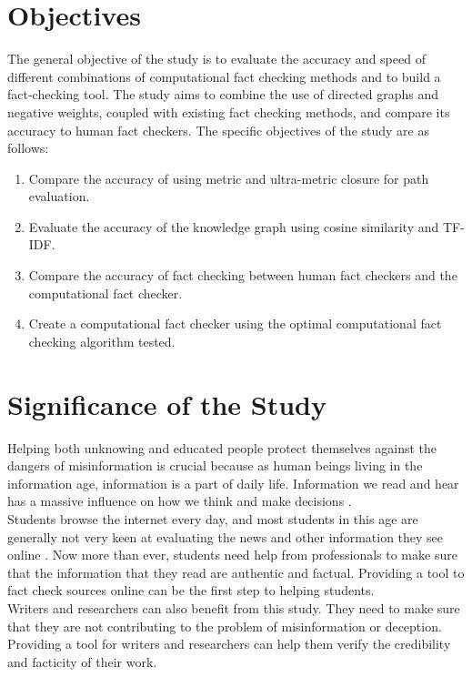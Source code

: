 \documentclass[10pt,11pt,12pt,oneside]{book}
\begin{document}
		
	\section{Objectives}
		The general objective of the study is to evaluate the accuracy and speed of different combinations of computational fact checking methods and to build a fact-checking tool. The study aims to combine the use of directed graphs and negative weights, coupled with existing fact checking methods, and compare its accuracy to human fact checkers. The specific objectives of the study are as follows:
		\begin{enumerate}
		    \item Compare the accuracy of using metric and ultra-metric closure for path evaluation.
		    \item Evaluate the accuracy of the knowledge graph using cosine similarity and TF-IDF.
		    \item Compare the accuracy of fact checking between human fact checkers and the computational fact checker.
		    \item Create a computational fact checker using the optimal computational fact checking algorithm tested.
		\end{enumerate}

	\section{Significance of the Study}
		 Helping both unknowing and educated people protect themselves against the dangers of misinformation is crucial because as human beings living in the information age, information is a part of daily life. Information we read and hear has a massive influence on how we think and make decisions \cite{DelVicario_2016}.\\[8pt]
		
		Students browse the internet every day, and most students in this age are generally not very keen at evaluating the news and other information they see online \cite{mcgrew2017challenge}. Now more than ever, students need help from professionals to make sure that the information that they read are authentic and factual. Providing a tool to fact check sources online can be the first step to helping students.\\
	
		Writers and researchers can also benefit from this study. They need to make sure that they are not contributing to the problem of misinformation or deception. Providing a tool for writers and researchers can help them verify the credibility and facticity of their work.
		
\end{document}
